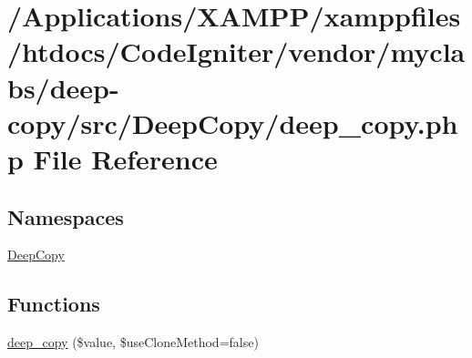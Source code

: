 \hypertarget{deep__copy_8php}{}\section{/\+Applications/\+X\+A\+M\+P\+P/xamppfiles/htdocs/\+Code\+Igniter/vendor/myclabs/deep-\/copy/src/\+Deep\+Copy/deep\+\_\+copy.php File Reference}
\label{deep__copy_8php}
\subsection*{Namespaces}
\begin{DoxyCompactItemize}
\item 
 \mbox{\hyperlink{namespace_deep_copy}{Deep\+Copy}}
\end{DoxyCompactItemize}
\subsection*{Functions}
\begin{DoxyCompactItemize}
\item 
\mbox{\hyperlink{namespace_deep_copy_a9fb9a0a04a3453639d27a6d6fba4a2b6}{deep\+\_\+copy}} (\$value, \$use\+Clone\+Method=false)
\end{DoxyCompactItemize}
